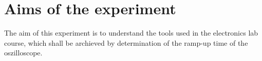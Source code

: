 \section{Aims of the experiment}
The aim of this experiment is to understand the tools used in the electronics lab course, which shall be archieved by determination of the ramp-up time of the oszilloscope.